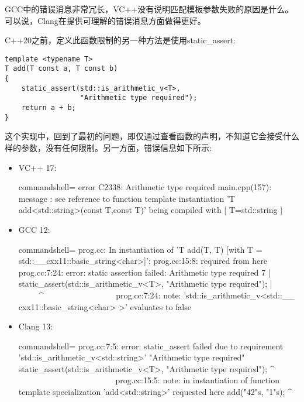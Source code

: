 GCC中的错误消息非常冗长，VC++没有说明匹配模板参数失败的原因是什么。可以说，Clang在提供可理解的错误消息方面做得更好。

C++20之前，定义此函数限制的另一种方法是使用static\_assert:

\begin{lstlisting}[style=styleCXX]
template <typename T>
T add(T const a, T const b)
{
	static_assert(std::is_arithmetic_v<T>,
				  "Arithmetic type required");
	return a + b;
}
\end{lstlisting}

这个实现中，回到了最初的问题，即仅通过查看函数的声明，不知道它会接受什么样的参数，没有任何限制。另一方面，错误信息如下所示:

\begin{itemize}
\item
VC++ 17:

\begin{tcblisting}{commandshell={}}
error C2338: Arithmetic type required
main.cpp(157): message : see reference to function
template instantiation 'T add<std::string>(const T,const
T)' being compiled
     with
     [
         T=std::string
     ]
\end{tcblisting}

\item
GCC 12:

\begin{tcblisting}{commandshell={}}
prog.cc: In instantiation of 'T add(T, T) [with T =
std::__cxx11::basic_string<char>]':
prog.cc:15:8: required from here
prog.cc:7:24: error: static assertion failed: Arithmetic
type required
    7 | static_assert(std::is_arithmetic_v<T>,
"Arithmetic type required");
      |                         ~~~~~^~~~~~~~~~~~~~~~~~
prog.cc:7:24: note: 'std::is_arithmetic_v<std::__
cxx11::basic_string<char> >' evaluates to false
\end{tcblisting}

\item
Clang 13:

\begin{tcblisting}{commandshell={}}
prog.cc:7:5: error: static_assert failed due to
requirement 'std::is_arithmetic_v<std::string>'
"Arithmetic type required"
     static_assert(std::is_arithmetic_v<T>, "Arithmetic
type required");
     ^ ~~~~~~~~~~~~~~~~~~~~~~~
prog.cc:15:5: note: in instantiation of function template
specialization 'add<std::string>' requested here
    add("42"s, "1"s);
    ^
\end{tcblisting}
\end{itemize}

